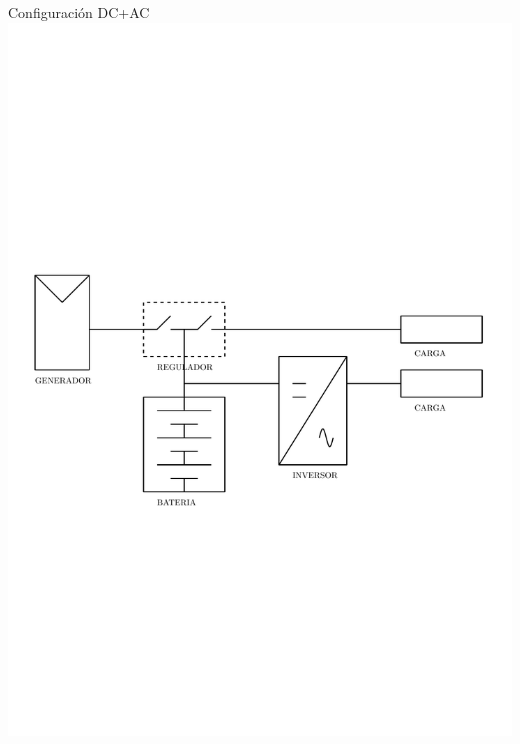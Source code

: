 \documentclass[xcolor={usenames,svgnames,dvipsnames}]{beamer}
\begin{document}
\begin{frame}[label=sec-1-0-4]{Configuración DC+AC}
\includegraphics[width=.9\linewidth]{../figs/DiagramaUnifilarER_AC_DC.pdf}
\end{frame}
\end{document}
